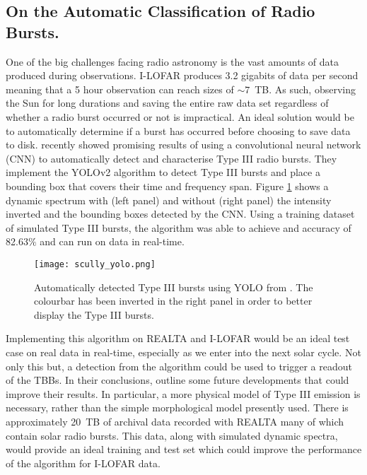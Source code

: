 \subsection{On the Automatic Classification of Radio Bursts.}
One of the big challenges facing radio astronomy is the vast amounts of data produced during observations. I-LOFAR produces 3.2 gigabits of data per second meaning that a 5 hour observation can reach sizes of $\sim 7$~TB. As such, observing the Sun for long durations and saving the entire raw data set regardless of whether a radio burst occurred or not is impractical. An ideal solution would be to automatically determine if a burst has occurred before choosing to save data to disk. \cite{Scully2021} recently showed promising results of using a convolutional neural network (CNN) to automatically detect and characterise Type III radio bursts. They implement the YOLOv2 \citep[You Only Look Once;][]{Yolo9000} algorithm to detect Type III bursts and place a bounding box that covers their time and frequency span. Figure \ref{fig:yolo} shows a dynamic spectrum with (left panel) and without (right panel) the intensity inverted and the bounding boxes detected by the CNN. Using a training dataset of simulated Type III bursts, the algorithm was able to achieve and accuracy of 82.63$\%$ and can run on data in real-time.  

\begin{figure}[ht]
\centering
\texttt{[image: scully\_yolo.png]}
\caption[Automatically detected Type III bursts using YOLO]{Automatically detected Type III bursts using YOLO from \cite{Scully2021}. The colourbar has been inverted in the right panel in order to better display the Type III bursts. }
\label{fig:yolo}
\end{figure}

Implementing this algorithm on REALTA and I-LOFAR would be an ideal test case on real data in real-time, especially as we enter into the next solar cycle. Not only this but, a detection from the algorithm could be used to trigger a readout of the TBBs.
In their conclusions, \cite{Scully2021} outline some future developments that could improve their results. In particular, a more physical model of Type III emission is necessary, rather than the simple morphological model presently used. There is approximately 20~TB of archival data recorded with REALTA many of which contain solar radio bursts. This data, along with simulated dynamic spectra, would provide an ideal training and test set which could improve the performance of the algorithm for I-LOFAR data.

